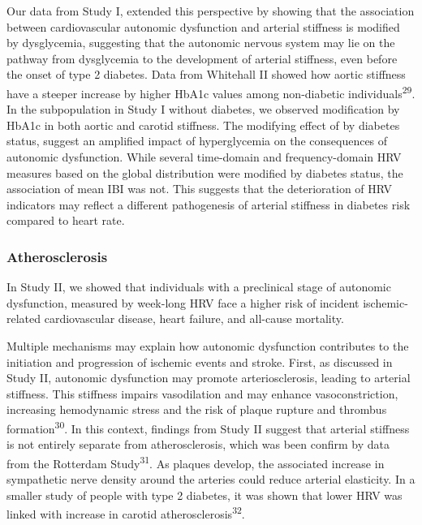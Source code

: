 \documentclass[
  a4paper,
  headsepline=true,
  open=any]{scrbook}
\begin{document}
Our data from Study I, extended this perspective by showing that the
association between cardiovascular autonomic dysfunction and arterial
stiffness is modified by dysglycemia, suggesting that the autonomic
nervous system may lie on the pathway from dysglycemia to the
development of arterial stiffness, even before the onset of type 2
diabetes. Data from Whitehall II showed how aortic stiffness have a
steeper increase by higher HbA1c values among non-diabetic
individuals\textsuperscript{29}. In the subpopulation in Study I without
diabetes, we observed modification by HbA1c in both aortic and carotid
stiffness. The modifying effect of by diabetes status, suggest an
amplified impact of hyperglycemia on the consequences of autonomic
dysfunction. While several time-domain and frequency-domain HRV measures
based on the global distribution were modified by diabetes status, the
association of mean IBI was not. This suggests that the deterioration of
HRV indicators may reflect a different pathogenesis of arterial
stiffness in diabetes risk compared to heart rate.

\hypertarget{atherosclerosis-1}{%
\subsubsection{Atherosclerosis}\label{atherosclerosis-1}}

In Study II, we showed that individuals with a preclinical stage of
autonomic dysfunction, measured by week-long HRV face a higher risk of
incident ischemic-related cardiovascular disease, heart failure, and
all-cause mortality.

Multiple mechanisms may explain how autonomic dysfunction contributes to
the initiation and progression of ischemic events and stroke. First, as
discussed in Study II, autonomic dysfunction may promote
arteriosclerosis, leading to arterial stiffness. This stiffness impairs
vasodilation and may enhance vasoconstriction, increasing hemodynamic
stress and the risk of plaque rupture and thrombus
formation\textsuperscript{30}. In this context, findings from Study II
suggest that arterial stiffness is not entirely separate from
atherosclerosis, which was been confirm by data from the Rotterdam
Study\textsuperscript{31}. As plaques develop, the associated increase
in sympathetic nerve density around the arteries could reduce arterial
elasticity. In a smaller study of people with type 2 diabetes, it was
shown that lower HRV was linked with increase in carotid
atherosclerosis\textsuperscript{32}.
\end{document}
